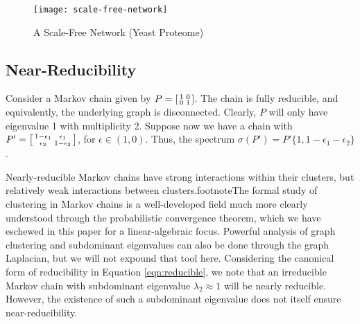 \documentclass[../exploring-pagerank.tex]{subfiles}
\begin{document}
    \begin{figure}
        \centering
        \texttt{[image: scale-free-network]}
        \caption{A Scale-Free Network (Yeast Proteome) \cite{wangKineticConformationalCharacterization}}
        \label{fig:scale-free}
    \end{figure}
    \subsection{Near-Reducibility}
    Consider a Markov chain given by $P=\begin{bsmallmatrix} 1 & 0 \\ 0 & 1 \end{bsmallmatrix}$. The chain is fully reducible, and equivalently, the underlying graph is disconnected. Clearly, $P$ will only have eigenvalue 1 with multiplicity 2. Suppose now we have a chain with $P'=\begin{bsmallmatrix} 1 - \epsilon_1  & \epsilon_1 \\ \epsilon_2 & 1 - \epsilon_2 \end{bsmallmatrix}$, for $\epsilon \in (1,0)$. Thus, the spectrum $\sigma(P') =P' \{ 1, 1-\epsilon_1 - \epsilon_2 \}$.

    Nearly-reducible Markov chains have strong interactions within their clusters, but relatively weak interactions between clusters.footnote{The formal study of clustering in Markov chains is a well-developed field much more clearly understood through the probabilistic convergence theorem, which we have eschewed in this paper for a linear-algebraic focus. Powerful analysis of graph clustering and subdominant eigenvalues can also be done through the graph Laplacian, but we will not expound that tool here.} Considering the canonical form of reducibility in Equation \eqref{eqn:reducible}, we note that an irreducible Markov chain with subdominant eigenvalue $\lambda_2 \approx 1$ will be nearly reducible. However, the existence of such a subdominant eigenvalue does not itself ensure near-reducibility.
\end{document}
